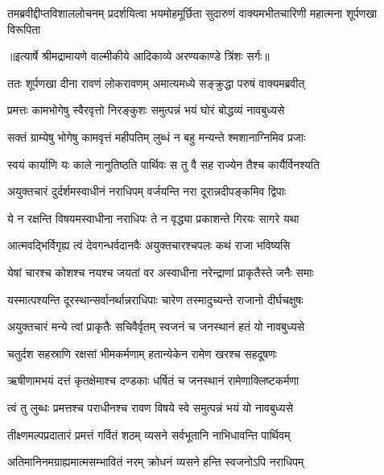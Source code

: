 \fourlineindentedshloka
{तमब्रवीद्दीप्तविशाललोचनम्}
{प्रदर्शयित्वा भयमोहमूर्छिता}
{सुदारुणं वाक्यमभीतचारिणी}
{महात्मना शूर्पणखा विरूपिता} %


{॥इत्यार्षे श्रीमद्रामायणे वाल्मीकीये आदिकाव्ये अरण्यकाण्डे त्रिंशः सर्गः॥}


\twolineshloka
{ततः शूर्पणखा दीना रावणं लोकरावणम्}
{अमात्यमध्ये सङ्क्रुद्धा परुषं वाक्यमब्रवीत्} %

\twolineshloka
{प्रमत्तः कामभोगेषु स्वैरवृत्तो निरङ्कुशः}
{समुत्पन्नं भयं घोरं बोद्धव्यं नावबुध्यसे} %

\twolineshloka
{सक्तं ग्राम्येषु भोगेषु कामवृत्तं महीपतिम्}
{लुब्धं न बहु मन्यन्ते श्मशानाग्निमिव प्रजाः} %

\twolineshloka
{स्वयं कार्याणि यः काले नानुतिष्ठति पार्थिवः}
{स तु वै सह राज्येन तैश्च कार्यैर्विनश्यति} %

\twolineshloka
{अयुक्तचारं दुर्दर्शमस्वाधीनं नराधिपम्}
{वर्जयन्ति नरा दूरान्नदीपङ्कमिव द्विपाः} %

\twolineshloka
{ये न रक्षन्ति विषयमस्वाधीना नराधिपः}
{ते न वृद्ध्या प्रकाशन्ते गिरयः सागरे यथा} %

\twolineshloka
{आत्मवद्भिर्विगृह्य त्वं देवगन्धर्वदानवैः}
{अयुक्तचारश्चपलः कथं राजा भविष्यसि} %

\twolineshloka
{येषां चारश्च कोशश्च नयश्च जयतां वर}
{अस्वाधीना नरेन्द्राणां प्राकृतैस्ते जनैः समाः} %

\twolineshloka
{यस्मात्पश्यन्ति दूरस्थान्सर्वानर्थान्नराधिपाः}
{चारेण तस्मादुच्यन्ते राजानो दीर्घचक्षुषः} %

\twolineshloka
{अयुक्तचारं मन्ये त्वां प्राकृतैः सचिवैर्वृतम्}
{स्वजनं च जनस्थानं हतं यो नावबुध्यसे} %

\twolineshloka
{चतुर्दश सहस्राणि रक्षसां भीमकर्मणाम्}
{हतान्येकेन रामेण खरश्च सहदूषणः} %

\twolineshloka
{ऋषीणामभयं दत्तं कृतक्षेमाश्च दण्डकाः}
{धर्षितं च जनस्थानं रामेणाक्लिष्टकर्मणा} %

\twolineshloka
{त्वं तु लुब्धः प्रमत्तश्च पराधीनश्च रावण}
{विषये स्वे समुत्पन्नं भयं यो नावबुध्यसे} %

\twolineshloka
{तीक्ष्णमल्पप्रदातारं प्रमत्तं गर्वितं शठम्}
{व्यसने सर्वभूतानि नाभिधावन्ति पार्थिवम्} %

\twolineshloka
{अतिमानिनमग्राह्यमात्मसम्भावितं नरम्}
{क्रोधनं व्यसने हन्ति स्वजनोऽपि नराधिपम्} %

